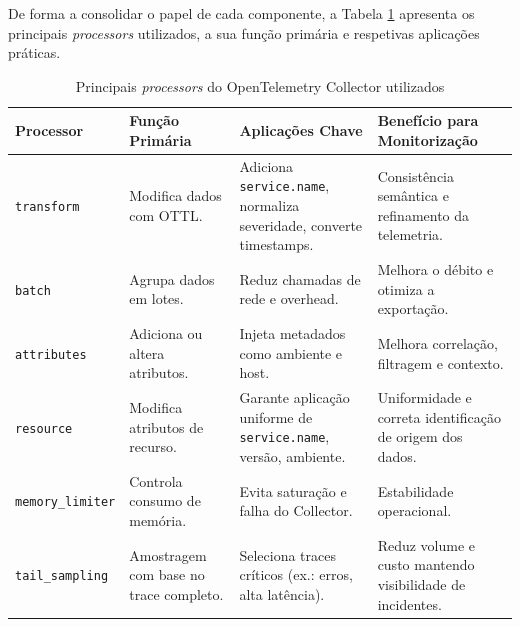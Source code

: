De forma a consolidar o papel de cada componente, a Tabela \ref{tab:otel-processors} apresenta os principais \textit{processors} utilizados, a sua função primária e respetivas aplicações práticas.

\begin{table}[H]
\centering
\caption{Principais \textit{processors} do OpenTelemetry Collector utilizados}
\label{tab:otel-processors}
\begin{tabular}{|p{3cm}|p{4cm}|p{4.2cm}|p{4.2cm}|}
\hline
\textbf{Processor} & \textbf{Função Primária} & \textbf{Aplicações Chave} & \textbf{Benefício para Monitorização} \\ \hline
\texttt{transform} & Modifica dados com OTTL. & Adiciona \texttt{service.name}, normaliza severidade, converte timestamps. & Consistência semântica e refinamento da telemetria. \\ \hline
\texttt{batch} & Agrupa dados em lotes. & Reduz chamadas de rede e overhead. & Melhora o débito e otimiza a exportação. \\ \hline
\texttt{attributes} & Adiciona ou altera atributos. & Injeta metadados como ambiente e host. & Melhora correlação, filtragem e contexto. \\ \hline
\texttt{resource} & Modifica atributos de recurso. & Garante aplicação uniforme de \texttt{service.name}, versão, ambiente. & Uniformidade e correta identificação de origem dos dados. \\ \hline
\texttt{memory\_limiter} & Controla consumo de memória. & Evita saturação e falha do Collector. & Estabilidade operacional. \\ \hline
\texttt{tail\_sampling} & Amostragem com base no trace completo. & Seleciona traces críticos (ex.: erros, alta latência). & Reduz volume e custo mantendo visibilidade de incidentes. \\ \hline
\end{tabular}
\end{table}

